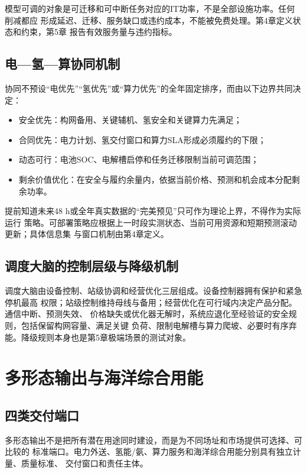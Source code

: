 模型可调的对象是可迁移和可中断任务对应的IT功率，不是全部设施功率。任何削减都应
形成延迟、迁移、服务缺口或违约成本，不能被免费处理。第4章定义状态和约束，第5章
报告有效服务量与违约指标。

\subsection{电—氢—算协同机制}

协同不预设“电优先”“氢优先”或“算力优先”的全年固定排序，而由以下边界共同决定：
\begin{itemize}
  \item 安全优先：构网备用、关键辅机、氢安全和关键算力先满足；
  \item 合同优先：电力计划、氢交付窗口和算力SLA形成必须履约的下限；
  \item 动态可行：电池SOC、电解槽启停和任务迁移限制当前可调范围；
  \item 剩余价值优化：在安全与履约余量内，依据当前价格、预测和机会成本分配剩余功率。
\end{itemize}

提前知道未来48 h或全年真实数据的“完美预见”只可作为理论上界，不得作为实际运行
策略。可部署策略应根据上一时段实测状态、当前可用资源和短期预测滚动更新；具体信息集
与窗口机制由第4章定义。

\subsection{调度大脑的控制层级与降级机制}

调度大脑由设备控制、站级协调和经营优化三层组成。设备控制器拥有保护和紧急停机最高
权限；站级控制维持母线与备用；经营优化在可行域内决定产品分配。通信中断、预测失效、
价格缺失或优化器无解时，系统应退化至经验证的安全规则，包括保留构网容量、满足关键
负荷、限制电解槽与算力爬坡、必要时有序弃能。降级规则本身也是第5章极端场景的测试对象。

\section{多形态输出与海洋综合用能}

\subsection{四类交付端口}

多形态输出不是把所有潜在用途同时建设，而是为不同场址和市场提供可选择、可比较的
标准端口。电力外送、氢能/氨、算力服务和海洋综合用能分别具有独立计量、质量标准、
交付窗口和责任主体。

